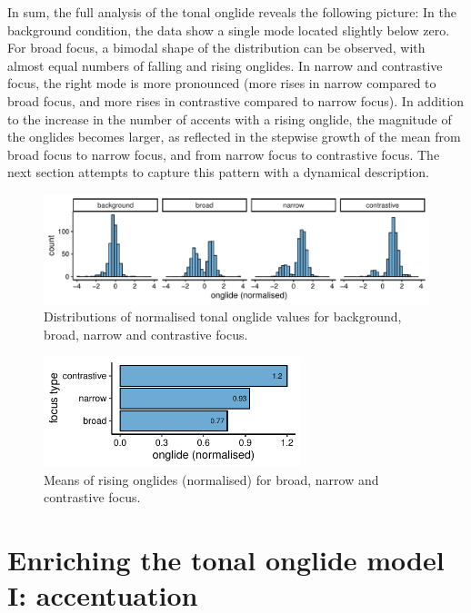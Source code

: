 In sum, the full analysis of the tonal onglide reveals the following picture: In the background condition, the data show a single mode located slightly below zero. For broad focus, a bimodal shape of the distribution can be observed, with almost equal numbers of falling and rising onglides. In narrow and contrastive focus, the right mode is more pronounced (more rises in narrow compared to broad focus, and more rises in contrastive compared to narrow focus). In addition to the increase in the number of accents with a rising onglide, the magnitude of the onglides becomes larger, as reflected in the stepwise growth of the mean from broad focus to narrow focus, and from narrow focus to contrastive focus. The next section attempts to capture this pattern with a dynamical description.

\begin{figure}[htbp]
\begin{center}
\includegraphics[width=\textwidth]{figures/ch7/onglide_norm_distribution_all.pdf}
\caption{Distributions of normalised tonal onglide values for background, broad, narrow and contrastive focus.}
\label{fig:onglide_distributions_across}
\end{center}
\end{figure}

\begin{figure}[htbp]
\begin{center}
\includegraphics[width=7.5cm]{figures/ch7/onglide_norm_rising_means.pdf}
\caption{Means of rising onglides (normalised) for broad, narrow and contrastive focus.}
\label{fig:onglide_means_second_occurence}
\end{center}
\end{figure}

\section{Enriching the tonal onglide model I: accentuation}

